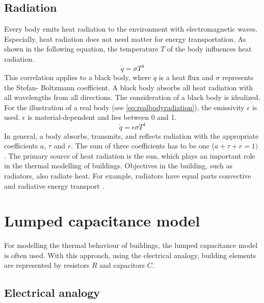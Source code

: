\subsection{Radiation}
\label{subsection:radiation}

    Every body emits heat radiation to the environment with electromagnetic waves. Especially, heat radiation does not need matter for energy transportation. As shown in the following equation, the temperature $T$ of the body influences heat radiation.\cite{.2013} 
    \begin{equation}
    \label{eq:radiation}
        \dot{q} = \sigma T^4
    \end{equation}
    This correlation applies to a black body, where $\dot{q}$ is a heat flux and $\sigma$ represents the Stefan- Boltzmann coefficient. A black body absorbs all heat radiation with all wavelengths from all directions\cite{Griesinger.2019}. The consideration of a black body is idealized. For the illustration of a real body (see \autoref{eq:realbodyradiation}), the emissivity $\epsilon$ is used. $\epsilon$ is material-dependent and lies between 0 and 1.
    \begin{equation}
    \label{eq:realbodyradiation}
        \dot{q} = \epsilon \sigma T^4
    \end{equation}
    In general, a body absorbs, transmits, and reflects radiation with the appropriate coefficients $a$, $\tau$ and $r$. The sum of three coefficients has to be one ($a + \tau + r = 1)$
    \cite{Baehr.2016}.
    \newline
    The primary source of heat radiation is the sun, which plays an important role in the thermal modelling of buildings. Objectives in the building, such as radiators, also radiate heat. For example, radiators have equal parts convective and radiative energy transport \cite{Hazyuk.2012}. 
    
\section{Lumped capacitance model}
\label{section:modelling}
For modelling the thermal behaviour of buildings, the lumped capacitance model is often used. With this approach, using the electrical analogy, building elements are represented by resistors $R$ and capacitors $C$. \cite{Kramer.2012}

\subsection{Electrical analogy}
\label{electricalanalogy}

